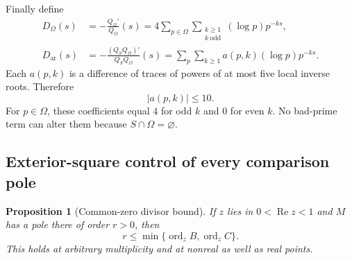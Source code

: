 \documentclass[11pt]{article}
\newtheorem{proposition}[theorem]{Proposition}
\theoremstyle{definition}
\theoremstyle{remark}
\newcommand{\ord}{\operatorname{ord}}
\newcommand{\Rea}{\operatorname{Re}}
\numberwithin{equation}{section}
\begin{document}
Finally define
\begin{align}
D_\Omega(s)&=-\frac{Q_\Omega'}{Q_\Omega}(s)
=4\sum_{p\in\Omega}\sum_{\substack{k\ge1\\k\ \mathrm{odd}}}
(\log p)p^{-ks},\label{eq:Dpositive}\\
D_{\mathrm{ar}}(s)&=-\frac{(Q_SQ_\Omega)'}{Q_SQ_\Omega}(s)
=\sum_p\sum_{k\ge1}a(p,k)(\log p)p^{-ks}.
\label{eq:Dar}
\end{align}
Each $a(p,k)$ is a difference of traces of powers of at most five local inverse roots. Therefore
\begin{equation}\label{eq:bound}
|a(p,k)|\le10.
\end{equation}
For $p\in\Omega$, these coefficients equal $4$ for odd $k$ and $0$ for even $k$. No bad-prime term can alter them because $S\cap\Omega=\varnothing$.

\subsection{Exterior-square control of every comparison pole}

\begin{proposition}[Common-zero divisor bound]\label{prop:commonpole}
If $z$ lies in $0<\Rea z<1$ and $M$ has a pole there of order $r>0$, then
\begin{equation}\label{eq:commonorder}
r\le\min\{\ord_zB,\ord_zC\}.
\end{equation}
This holds at arbitrary multiplicity and at nonreal as well as real points.
\end{proposition}
\end{document}
